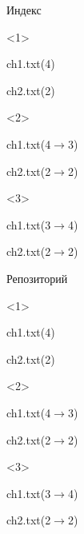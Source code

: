 \documentclass[9pt, aspectratio=1610]{beamer}
\begin{document}
\begin{frame}[t,fragile]
\begin{columns}[onlytextwidth]
\begin{column}[T]{\linewidth}
\begin{minipage}[t][3cm][t]{\linewidth}
\begin{minipage}[t]{0.29\textwidth}
\begin{exampleblock}{Индекс\strut}
						
					
						\begin{onlyenv}<1>
							\strut ch1.txt(4)
							\strut ch2.txt(2)
						\end{onlyenv}
						
						\begin{onlyenv}<2>
							\strut ch1.txt(4$\to$3)
							\strut ch2.txt(2$\to$2)
						\end{onlyenv}
						
						\begin{onlyenv}<3>
							\strut ch1.txt(3$\to$4)
							\strut ch2.txt(2$\to$2)
						\end{onlyenv}
						
						
					\end{exampleblock}
				\end{minipage}\hfill%
				\begin{minipage}[t]{0.29\textwidth}
					\begin{exampleblock}{Репозиторий\strut}      %
						
						\begin{onlyenv}<1>
							\rememb{a4}\strut ch1.txt(4)
							\rememb{b4}\strut ch2.txt(2)
						\end{onlyenv}
						
						\begin{onlyenv}<2>
							\strut ch1.txt(4$\to$3)
							\strut ch2.txt(2$\to$2)
						\end{onlyenv}
						
						\begin{onlyenv}<3>
							\strut ch1.txt(3$\to$4)
							\strut ch2.txt(2$\to$2)
						\end{onlyenv}
						
					\end{exampleblock}
				\end{minipage}\hfill%
			\end{minipage}		
			
		\end{column}
	\end{columns}
	
	
	
	
\end{frame}
\end{document}
